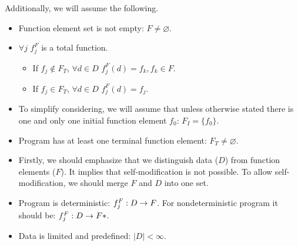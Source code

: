 Additionally, we will assume the following.
\begin{itemize}
    \item Function element set is not empty: $F \neq \varnothing$.
    \item $\forall j \,\, f^F_j$ is a total function.
    \begin{itemize}
        \item If $f_j \notin F_T$,
            $\forall d \in D \,\, f^F_j(d) = f_k, f_k \in F$.
        \item If $f_j \in F_T$,
            $\forall d \in D \,\, f^F_j(d) = f_j$.
    \end{itemize}
    \item To simplify considering, we will assume that unless otherwise stated
        there is one and only one initial function element $f_0$:
        $F_I = \{f_0\}$.
    \item Program has at least one terminal function element:
        $F_T \neq \varnothing$.
\end{itemize}



\begin{itemize}
    \item Firstly, we should emphasize that we distinguish data ($D$)
        from function elements ($F$).
        It implies that self-modification is not possible.
        To allow self-modification, we should merge $F$ and $D$ into one set.
    \item Program is deterministic: $f^F_j: D \rightarrow F$.
        For nondeterministic program it should be: $f^F_j: D \rightarrow F*$.
    \item Data is limited and predefined: $|D| < \infty$.
\end{itemize}



